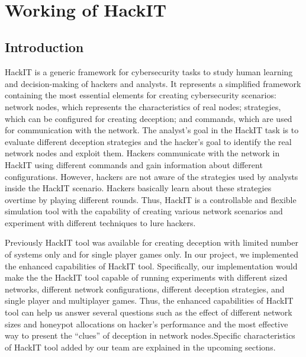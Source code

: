 \clearpage
\thispagestyle{empty}
~\clearpage
\chapter{Working of HackIT}
\label{chap2}

\section{Introduction}\label{2}
HackIT is a generic framework for cybersecurity tasks to study human learning and decision-making of hackers and analysts. It represents a simplified framework containing the most essential elements for creating cybersecurity scenarios: network nodes, which represents the characteristics of real nodes; strategies, which can be configured for creating deception; and commands, which are used for communication with the network. The analyst’s goal in the HackIT task is to evaluate different deception strategies and the hacker’s goal to identify the real network nodes and exploit them. Hackers communicate with the network in HackIT using different commands and gain information about different configurations. However, hackers are not aware of the strategies used by analysts inside the HackIT scenario. Hackers basically learn about these strategies overtime by playing different rounds. Thus, HackIT is a controllable and flexible simulation tool with the capability of creating various network scenarios and experiment with different techniques to lure hackers.

Previously HackIT tool was available for creating deception with limited number of systems only and for single player games only. In our project, we implemented the enhanced capabilities of HackIT tool. Specifically, our implementation would make the the HackIT tool capable of running experiments with different sized networks, different network configurations, different deception strategies, and single player and multiplayer games. Thus, the enhanced capabilities of HackIT tool can help us answer several questions such as the effect of different network sizes and honeypot allocations on hacker’s performance and the most effective way to present the “clues” of deception in network nodes.Specific characteristics of
HackIT tool added by our team are explained in the upcoming sections.

